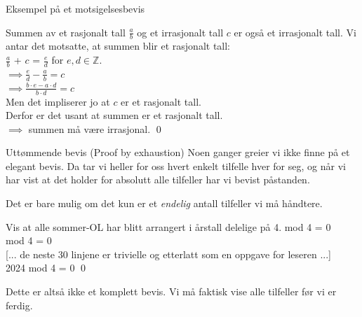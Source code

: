 \begin{frame}{Eksempel på et motsigelsesbevis}
    \begin{block}{Summen av et rasjonalt tall $\frac{a}{b}$ og et irrasjonalt tall $c$ er også et irrasjonalt tall.}
        \pause
        Vi antar det motsatte, at summen blir et rasjonalt tall: \\
        \pause
        $\frac{a}{b}$ + $c$ = $\frac{e}{d}$ for $e, d \in \mathbb{Z}$.\\
        \pause
        $\implies \frac{e}{d} - \frac{a}{b} = c$\\
        \pause
        $\implies \frac{b\cdot e - a \cdot d}{b\cdot d} = c$\\[1.5mm]
        \pause
        Men det impliserer jo at $c$ er et rasjonalt tall. \pause \text{\Lightning}\\
        \pause
        Derfor er det usant at summen er et rasjonalt tall.\\
        $\implies$ summen må være irrasjonal.
        \qed
    \end{block}
\end{frame}

\begin{frame}{Uttømmende bevis (Proof by exhaustion)}
    Noen ganger greier vi ikke finne på et elegant bevis. 
    Da tar vi heller for oss hvert enkelt tilfelle hver for seg, og når vi har vist at det holder 
    for absolutt alle tilfeller har vi bevist påstanden. 
    
    Det er bare mulig om det kun er et \emph{endelig} antall tilfeller vi må håndtere.
    \pause
    \begin{block}{Vis at alle sommer-OL har blitt arrangert i årstall delelige på 4.}
         mod 4 = 0 \checkmark \\
         mod 4 = 0 \checkmark \\
        \pause
        {[... de neste 30 linjene er trivielle og etterlatt som en oppgave for leseren ...]}\\
        2024 mod 4 = 0 \checkmark \qed
    \end{block}
    \pause
    Dette er altså ikke et komplett bevis. Vi må faktisk vise alle tilfeller før vi er ferdig.
\end{frame}
